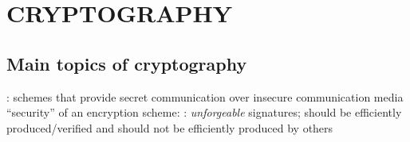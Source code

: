 \section{CRYPTOGRAPHY}
\subsection{Main topics of cryptography}
\bit
\w {}: schemes that provide secret communication over
insecure communication media
  \bit
  \w ``security'' of an encryption scheme:
  \eit
\w {}: {\em unforgeable\/} signatures; should
be efficiently  produced/verified and should not be efficiently produced by others
\w {}
\w 
\eit